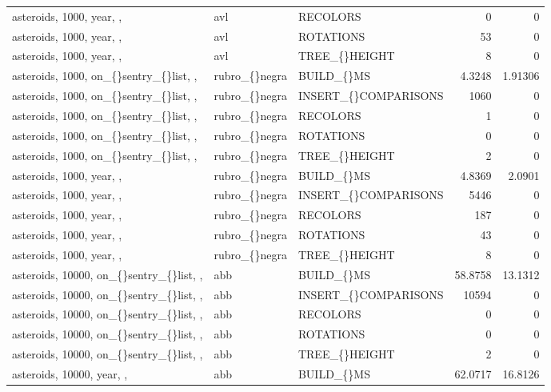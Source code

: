 \begin{longtable}{p{4cm}p{1.4cm}p{2.6cm}rr}
asteroids, 1000, year, ,  & avl & RECOLORS & 0 & 0\\
asteroids, 1000, year, ,  & avl & ROTATIONS & 53 & 0\\
asteroids, 1000, year, ,  & avl & TREE\_\allowbreak\{\}HEIGHT & 8 & 0\\
asteroids, 1000, on\_\allowbreak\{\}sentry\_\allowbreak\{\}list, ,  & rubro\_\allowbreak\{\}negra & BUILD\_\allowbreak\{\}MS & 4.3248 & 1.91306\\
asteroids, 1000, on\_\allowbreak\{\}sentry\_\allowbreak\{\}list, ,  & rubro\_\allowbreak\{\}negra & INSERT\_\allowbreak\{\}COMPARISONS & 1060 & 0\\
asteroids, 1000, on\_\allowbreak\{\}sentry\_\allowbreak\{\}list, ,  & rubro\_\allowbreak\{\}negra & RECOLORS & 1 & 0\\
asteroids, 1000, on\_\allowbreak\{\}sentry\_\allowbreak\{\}list, ,  & rubro\_\allowbreak\{\}negra & ROTATIONS & 0 & 0\\
asteroids, 1000, on\_\allowbreak\{\}sentry\_\allowbreak\{\}list, ,  & rubro\_\allowbreak\{\}negra & TREE\_\allowbreak\{\}HEIGHT & 2 & 0\\
asteroids, 1000, year, ,  & rubro\_\allowbreak\{\}negra & BUILD\_\allowbreak\{\}MS & 4.8369 & 2.0901\\
asteroids, 1000, year, ,  & rubro\_\allowbreak\{\}negra & INSERT\_\allowbreak\{\}COMPARISONS & 5446 & 0\\
asteroids, 1000, year, ,  & rubro\_\allowbreak\{\}negra & RECOLORS & 187 & 0\\
asteroids, 1000, year, ,  & rubro\_\allowbreak\{\}negra & ROTATIONS & 43 & 0\\
asteroids, 1000, year, ,  & rubro\_\allowbreak\{\}negra & TREE\_\allowbreak\{\}HEIGHT & 8 & 0\\
asteroids, 10000, on\_\allowbreak\{\}sentry\_\allowbreak\{\}list, ,  & abb & BUILD\_\allowbreak\{\}MS & 58.8758 & 13.1312\\
asteroids, 10000, on\_\allowbreak\{\}sentry\_\allowbreak\{\}list, ,  & abb & INSERT\_\allowbreak\{\}COMPARISONS & 10594 & 0\\
asteroids, 10000, on\_\allowbreak\{\}sentry\_\allowbreak\{\}list, ,  & abb & RECOLORS & 0 & 0\\
asteroids, 10000, on\_\allowbreak\{\}sentry\_\allowbreak\{\}list, ,  & abb & ROTATIONS & 0 & 0\\
asteroids, 10000, on\_\allowbreak\{\}sentry\_\allowbreak\{\}list, ,  & abb & TREE\_\allowbreak\{\}HEIGHT & 2 & 0\\
asteroids, 10000, year, ,  & abb & BUILD\_\allowbreak\{\}MS & 62.0717 & 16.8126\\

\end{longtable}
